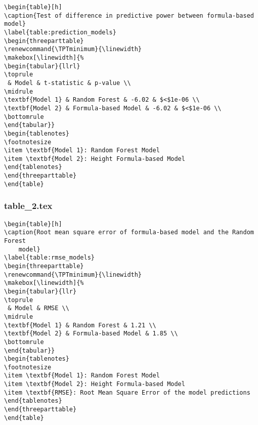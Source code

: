\documentclass[11pt]{article}
\begin{document}
\begin{Verbatim}[tabsize=4]
\begin{table}[h]
\caption{Test of difference in predictive power between formula-based model}
\label{table:prediction_models}
\begin{threeparttable}
\renewcommand{\TPTminimum}{\linewidth}
\makebox[\linewidth]{%
\begin{tabular}{llrl}
\toprule
 & Model & t-statistic & p-value \\
\midrule
\textbf{Model 1} & Random Forest & -6.02 & $<$1e-06 \\
\textbf{Model 2} & Formula-based Model & -6.02 & $<$1e-06 \\
\bottomrule
\end{tabular}}
\begin{tablenotes}
\footnotesize
\item \textbf{Model 1}: Random Forest Model
\item \textbf{Model 2}: Height Formula-based Model
\end{tablenotes}
\end{threeparttable}
\end{table}

\end{Verbatim}

\subsubsection*{table\_2.tex}

\begin{Verbatim}[tabsize=4]
\begin{table}[h]
\caption{Root mean square error of formula-based model and the Random Forest
	model}
\label{table:rmse_models}
\begin{threeparttable}
\renewcommand{\TPTminimum}{\linewidth}
\makebox[\linewidth]{%
\begin{tabular}{llr}
\toprule
 & Model & RMSE \\
\midrule
\textbf{Model 1} & Random Forest & 1.21 \\
\textbf{Model 2} & Formula-based Model & 1.85 \\
\bottomrule
\end{tabular}}
\begin{tablenotes}
\footnotesize
\item \textbf{Model 1}: Random Forest Model
\item \textbf{Model 2}: Height Formula-based Model
\item \textbf{RMSE}: Root Mean Square Error of the model predictions
\end{tablenotes}
\end{threeparttable}
\end{table}

\end{Verbatim}
\end{document}
